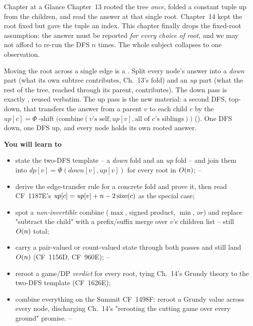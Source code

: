 \begin{chaptertheorybox}{Chapter at a Glance}
Chapter~13 rooted the tree \emph{once}, folded a constant tuple up from the
children, and read the answer at that single root. Chapter~14 kept the root
fixed but gave the tuple an index. This chapter finally drops the fixed-root
assumption: the answer must be reported \emph{for every choice of root}, and
we may not afford to re-run the DFS $n$ times.  The whole subject collapses
to one observation.

Moving the root across a single edge is a .  Split
every node's answer into a \emph{down} part (what its own subtree contributes,
Ch.~13's fold) and an \emph{up} part (what the rest of the tree, reached
through its parent, contributes).  The down pass is exactly
, reused verbatim.  The up pass is the new
material: a second DFS, top-down, that transfers the answer from a parent
$v$ to each child $c$ by the 
$\mathit{up}[c] = \Phi\!\operatorname{-shift}\!\bigl(\text{combine}(v\text{'s self},
\mathit{up}[v], \text{all of }c\text{'s siblings})\bigr)$
().  One DFS down, one DFS up, and every node holds
its own rooted answer.

\textbf{You will learn to}
\begin{itemize}[nosep]
  \item state the two-DFS template -- a \emph{down} fold and an \emph{up}
        fold -- and join them into $\mathit{dp}[v]=\Phi(\mathit{down}[v],
        \mathit{up}[v])$ for every root in $O(n)$; \hfill{}--
  \item derive the edge-transfer rule for a concrete fold and prove it,
        then read CF~1187E's $\mathit{up}[c]=\mathit{up}[v]+n-2\operatorname{size}(c)$
        as the special case; \hfill{}
  \item spot a \emph{non-invertible} combine ($\max$, signed product,
        $\min$, $\mathit{or}$) and replace "subtract the child" with a
        prefix/suffix merge over $v$'s children list -- still $O(n)$
        total; \hfill{}
  \item carry a pair-valued or count-valued state through both passes and
        still land $O(n)$ (CF~1156D, CF~960E); \hfill{}--
  \item reroot a game/DP \emph{verdict} for every root, tying Ch.~14's
        Grundy theory to the two-DFS template (CF~1626E); \hfill{}
  \item combine everything on the Summit CF~1498F: reroot a Grundy value
        across every node, discharging Ch.~14's "rerooting the cutting game
        over every ground" promise. \hfill{}--
\end{itemize}


\end{chaptertheorybox}
